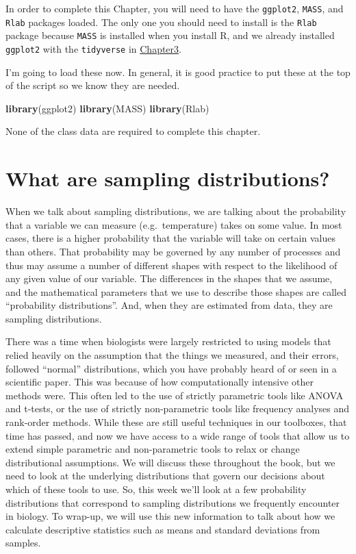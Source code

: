 \documentclass[
]{book}
\newenvironment{Shaded}{\begin{snugshade}}{\end{snugshade}}
\newcommand{\KeywordTok}[1]{\textcolor[rgb]{0.13,0.29,0.53}{\textbf{#1}}}
\newcommand{\NormalTok}[1]{#1}
\begin{document}
In order to complete this Chapter, you will need to have the \texttt{ggplot2}, \texttt{MASS}, and \texttt{Rlab} packages loaded. The only one you should need to install is the \texttt{Rlab} package because \texttt{MASS} is installed when you install R, and we already installed \texttt{ggplot2} with the \texttt{tidyverse} in \protect\hyperlink{Chapter3}{Chapter3}.

I'm going to load these now. In general, it is good practice to put these at the top of the script so we know they are needed.

\begin{Shaded}
\begin{Highlighting}[]
\KeywordTok{library}\NormalTok{(ggplot2)}
\KeywordTok{library}\NormalTok{(MASS)}
\KeywordTok{library}\NormalTok{(Rlab)}
\end{Highlighting}
\end{Shaded}

None of the class data are required to complete this chapter.

\hypertarget{what-are-sampling-distributions}{%
\section{What are sampling distributions?}\label{what-are-sampling-distributions}}

When we talk about sampling distributions, we are talking about the probability that a variable we can measure (e.g.~temperature) takes on some value. In most cases, there is a higher probability that the variable will take on certain values than others. That probability may be governed by any number of processes and thus may assume a number of different shapes with respect to the likelihood of any given value of our variable. The differences in the shapes that we assume, and the mathematical parameters that we use to describe those shapes are called ``probability distributions''. And, when they are estimated from data, they are sampling distributions.

There was a time when biologists were largely restricted to using models that relied heavily on the assumption that the things we measured, and their errors, followed ``normal'' distributions, which you have probably heard of or seen in a scientific paper. This was because of how computationally intensive other methods were. This often led to the use of strictly parametric tools like ANOVA and t-tests, or the use of strictly non-parametric tools like frequency analyses and rank-order methods. While these are still useful techniques in our toolboxes, that time has passed, and now we have access to a wide range of tools that allow us to extend simple parametric and non-parametric tools to relax or change distributional assumptions. We will discuss these throughout the book, but we need to look at the underlying distributions that govern our decisions about which of these tools to use. So, this week we'll look at a few probability distributions that correspond to sampling distributions we frequently encounter in biology. To wrap-up, we will use this new information to talk about how we calculate descriptive statistics such as means and standard deviations from samples.
\end{document}
